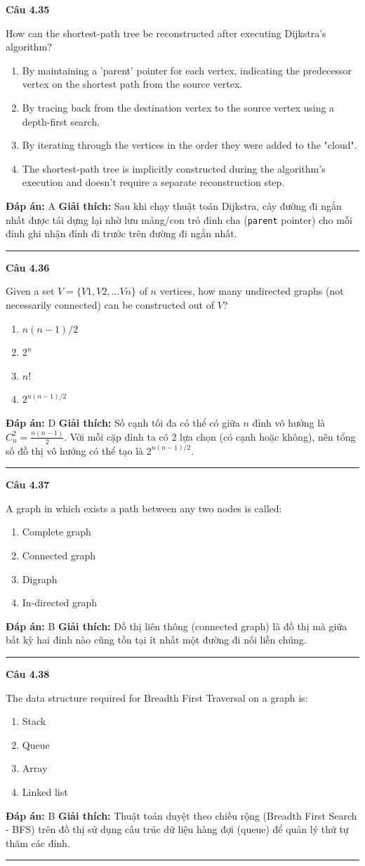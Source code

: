 \documentclass[11pt,a4paper]{article}
\newenvironment{question}[1]{%
  \par\vspace{1em}\noindent\textbf{\large Câu #1}\par\vspace{0.4em}
}{%
  \par\vspace{1em}\hrule\vspace{0.6em}
}
\newenvironment{choices}{%
  \begin{enumerate}[label=\textbf{\Alph*.},leftmargin=2.2em,itemsep=2pt,topsep=3pt]
}{%
  \end{enumerate}
}
\newcommand{\choice}{\item}
\begin{document}
\begin{question}{4.35}
How can the shortest-path tree be reconstructed after executing Dijkstra's algorithm?
\begin{choices}
\choice By maintaining a 'parent' pointer for each vertex, indicating the predecessor vertex on the shortest path from the source vertex.
\choice By tracing back from the destination vertex to the source vertex using a depth-first search.
\choice By iterating through the vertices in the order they were added to the "cloud".
\choice The shortest-path tree is implicitly constructed during the algorithm's execution and doesn't require a separate reconstruction step.
\end{choices}
\textbf{Đáp án:} A
\textbf{Giải thích:} Sau khi chạy thuật toán Dijkstra, cây đường đi ngắn nhất được tái dựng lại nhờ lưu mảng/con trỏ đỉnh cha (\texttt{parent} pointer) cho mỗi đỉnh ghi nhận đỉnh đi trước trên đường đi ngắn nhất.
\end{question}

\begin{question}{4.36}
Given a set $V = \{V1, V2, ...Vn\}$ of $n$ vertices, how many undirected graphs (not necessarily connected) can be constructed out of $V$?
\begin{choices}
\choice $n(n - 1)/2$
\choice $2^n$
\choice $n!$
\choice $2^{n(n-1)/2}$
\end{choices}
\textbf{Đáp án:} D
\textbf{Giải thích:} Số cạnh tối đa có thể có giữa $n$ đỉnh vô hướng là $C_n^2 = \frac{n(n-1)}{2}$. Với mỗi cặp đỉnh ta có 2 lựa chọn (có cạnh hoặc không), nên tổng số đồ thị vô hướng có thể tạo là $2^{n(n-1)/2}$.
\end{question}

\begin{question}{4.37}
A graph in which exists a path between any two nodes is called:
\begin{choices}
\choice Complete graph
\choice Connected graph
\choice Digraph
\choice In-directed graph
\end{choices}
\textbf{Đáp án:} B
\textbf{Giải thích:} Đồ thị liên thông (connected graph) là đồ thị mà giữa bất kỳ hai đỉnh nào cũng tồn tại ít nhất một đường đi nối liền chúng.
\end{question}

\begin{question}{4.38}
The data structure required for Breadth First Traversal on a graph is:
\begin{choices}
\choice Stack
\choice Queue
\choice Array
\choice Linked list
\end{choices}
\textbf{Đáp án:} B
\textbf{Giải thích:} Thuật toán duyệt theo chiều rộng (Breadth First Search - BFS) trên đồ thị sử dụng cấu trúc dữ liệu hàng đợi (queue) để quản lý thứ tự thăm các đỉnh.
\end{question}
\end{document}
